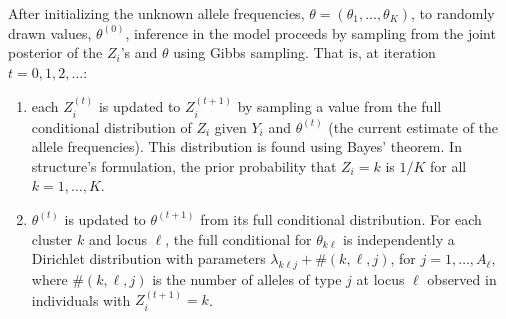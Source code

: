After initializing the unknown allele frequencies, $\theta = (\theta_1,\ldots,\theta_K)$, to randomly drawn values,
$\theta^{(0)}$, inference in the model proceeds by sampling from the joint posterior of the 
$Z_i$'s and $\theta$ using Gibbs sampling.  That is,
at iteration $t = 0, 1, 2, \ldots$:
\begin{enumerate}
\item each $Z^{(t)}_i$ is updated to $Z^{(t+1)}_i$ by sampling a value from 
the full conditional distribution of $Z_i$ given
$Y_i$ and $\theta^{(t)}$ (the current estimate of the allele frequencies).  This
distribution is found using Bayes' theorem. In {\sc structure}'s formulation, the 
prior probability that $Z_i=k$ is $1/K$ for all $k=1,\ldots, K$.     
\item $\theta^{(t)}$ is updated to $\theta^{(t+1)}$ from its full conditional distribution.  For each 
cluster
$k$ and locus $\ell$, the full conditional for $\theta_{k\ell}$ is independently a 
Dirichlet distribution with parameters $\lambda_{k\ell j} + \#(k,\ell,j)$, for 
$j=1,\ldots, A_\ell$,
where $\#(k,\ell,j)$ is the number of alleles of type $j$ at locus $\ell$ observed in 
individuals with $Z^{(t+1)}_i = k$.   
\end{enumerate}

